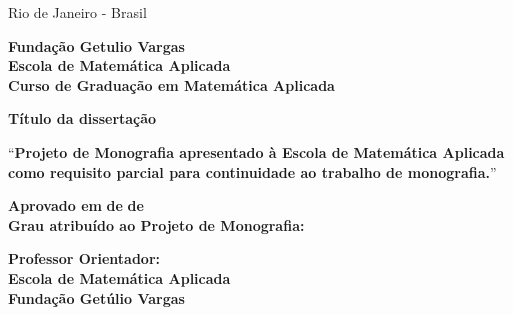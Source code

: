\documentclass[12pt]{article}
\begin{document}
\par
\vfill
\begin{center}
{{\normalsize Rio de Janeiro - Brasil}\\
{\normalsize \the\year}}
\end{center}

\thispagestyle{empty}

\newpage
\begin{center}
\textbf{\LARGE Fundação Getulio Vargas}\\ 
\textbf{\LARGE Escola de Matemática Aplicada}\\
\textbf{\LARGE Curso de Graduação em Matemática Aplicada}

\par
\vspace{100pt}
\textbf{\Large Título da dissertação}


\par
\vspace{65pt}

``\textbf{Projeto de Monografia apresentado à Escola de Matemática Aplicada como requisito parcial para continuidade ao trabalho de monografia.}''
\end{center}

\par
\vspace{65pt}
\begin{center}

\textbf{Aprovado em } \makebox[30pt]{\hrulefill}\textbf{ de }\makebox[120pt]{\hrulefill}\textbf{ de }\makebox[50pt]{\hrulefill}
\\
\vspace{5pt}
\textbf{Grau atribuído ao Projeto de Monografia:} \makebox[30pt]{\hrulefill}\\
\end{center}


\par
\vspace{40pt}
\begin{center}

\hrulefill

\vspace{5pt}
\textbf{Professor Orientador: }\\
\textbf{Escola de Matemática Aplicada}\\
\textbf{Fundação Getúlio Vargas}
\end{center}

\thispagestyle{empty}


\end{document}
